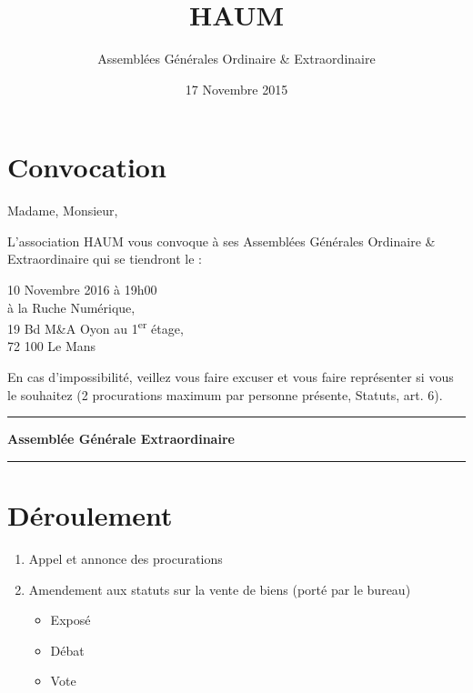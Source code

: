 \documentclass[11pt]{article}
\title{HAUM}
\author{Assemblées Générales Ordinaire \& Extraordinaire}
\date{17 Novembre 2015}
\begin{document}
\maketitle


\section*{Convocation}

Madame, Monsieur,

L'association HAUM vous convoque à ses Assemblées Générales Ordinaire \& Extraordinaire qui se tiendront le :

\begin{center}
{\Large 10 Novembre 2016 à 19h00}\\
à la Ruche Numérique,\\19 Bd M\&A Oyon au 1\textsuperscript{er} étage,\\72 100 Le Mans
\end{center}

En cas d'impossibilité, veillez vous faire excuser et vous faire représenter si vous le souhaitez (2 procurations maximum par personne présente, Statuts, art. 6).

\vspace{1.5cm}

\hrule
\vspace{.3cm}
\begin{center}
\Large\bfseries Assemblée Générale Extraordinaire
\end{center}
\vspace{.3cm}
\hrule

\vspace{1.5cm}

\section*{Déroulement}

\begin{enumerate}
    \item Appel et annonce des procurations
    \item Amendement aux statuts sur la vente de biens (porté par le bureau)
    \begin{itemize}
        \item Exposé
        \item Débat
        \item Vote
    \end{itemize}
\end{enumerate}
\end{document}
